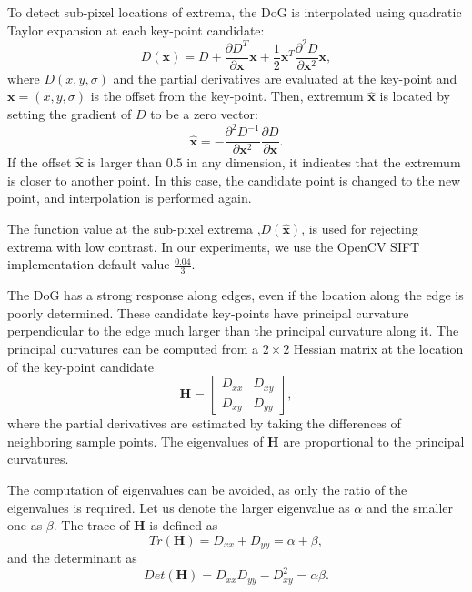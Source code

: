 To detect sub-pixel locations of extrema, the DoG is interpolated using quadratic Taylor expansion at each key-point candidate:
\begin{equation}
    D(\boldsymbol{x}) = D + \frac{\partial D^T}{\partial \boldsymbol{x}}\boldsymbol{x}+\frac{1}{2}\boldsymbol{x}^T\frac{\partial^2 D}{\partial \boldsymbol{x}^2}\boldsymbol{x},
    \label{eq:taylor_expansion}
\end{equation}
where \( D(x,y,\sigma) \) and the partial derivatives are evaluated at the key-point and \( \boldsymbol{x}=(x,y,\sigma) \) is the offset from the key-point. Then, extremum \( \hat{\boldsymbol{x}} \) is located by setting the gradient of \( D \) to be a zero vector:
\begin{equation}
    \hat{\boldsymbol{x}} = - \frac{\partial^2 D^{-1}}{\partial \boldsymbol{x}^2}\frac{\partial D}{\partial \boldsymbol{x}}.
    \label{eq:taylor_extremum}
\end{equation}
If the offset \( \hat{\boldsymbol{x}} \) is larger than \( 0.5 \) in any dimension, it indicates that the extremum is closer to another point. In this case, the candidate point is changed to the new point, and interpolation is performed again.

The function value at the sub-pixel extrema ,$D(\hat{\boldsymbol{x}})$, is used for rejecting extrema with low contrast. In our experiments, we use the OpenCV SIFT implementation default value $\frac{0.04}{3}$\cite{openCV}.

The DoG has a strong response along edges, even if the location along the edge is poorly determined. These candidate key-points have principal curvature perpendicular to the edge much larger than the principal curvature along it. The principal curvatures can be computed from a $2\times2$ Hessian matrix at the location of the key-point candidate
\begin{equation}
    \boldsymbol{H} =
    \begin{bmatrix}
        D_{xx} & D_{xy}\\
        D_{xy} & D_{yy}
    \end{bmatrix},
    \label{eq:hessian}
\end{equation}
where the partial derivatives are estimated by taking the differences of neighboring sample points. The eigenvalues of $\boldsymbol{H}$ are proportional to the principal curvatures.

The computation of eigenvalues can be avoided, as only the ratio of the eigenvalues is required. Let us denote the larger eigenvalue as $\alpha$ and the smaller one as $\beta$. The trace of $\boldsymbol{H}$ is defined as
\begin{equation}
    Tr(\boldsymbol{H}) = D_{xx}+D_{yy} = \alpha+\beta,
\end{equation}
and the determinant as
\begin{equation}
    Det(\boldsymbol{H}) = D_{xx}D_{yy}-D_{xy}^2 = \alpha\beta.
\end{equation}

